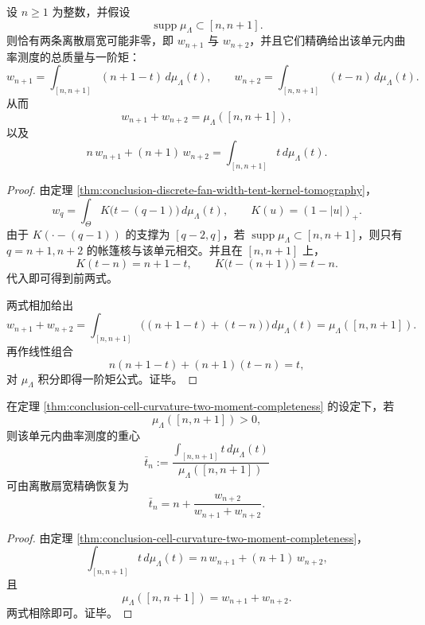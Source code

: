 \begin{theorem}[单元曲率的二矩完备性]\label{thm:conclusion-cell-curvature-two-moment-completeness}
设 \(n\ge 1\) 为整数，并假设
\[
\operatorname{supp}\mu_\Lambda\subset [n,n+1].
\]
则恰有两条离散扇宽可能非零，即 \(w_{n+1}\) 与 \(w_{n+2}\)，并且它们精确给出该单元内曲率测度的总质量与一阶矩：
\[
w_{n+1}=\int_{[n,n+1]}(n+1-t)\,d\mu_\Lambda(t),
\qquad
w_{n+2}=\int_{[n,n+1]}(t-n)\,d\mu_\Lambda(t).
\]
从而
\[
w_{n+1}+w_{n+2}=\mu_\Lambda([n,n+1]),
\]
以及
\[
n\,w_{n+1}+(n+1)\,w_{n+2}
=
\int_{[n,n+1]} t\,d\mu_\Lambda(t).
\]
\end{theorem}
\begin{proof}
由定理 \ref{thm:conclusion-discrete-fan-width-tent-kernel-tomography}，
\[
w_q=\int_\Theta K\bigl(t-(q-1)\bigr)\,d\mu_\Lambda(t),
\qquad
K(u)=(1-|u|)_+.
\]
由于 \(K(\cdot-(q-1))\) 的支撑为 \([q-2,q]\)，若 \(\operatorname{supp}\mu_\Lambda\subset[n,n+1]\)，则只有 \(q=n+1,n+2\) 的帐篷核与该单元相交。并且在 \([n,n+1]\) 上，
\[
K(t-n)=n+1-t,
\qquad
K\bigl(t-(n+1)\bigr)=t-n.
\]
代入即可得到前两式。

两式相加给出
\[
w_{n+1}+w_{n+2}
=
\int_{[n,n+1]}\bigl((n+1-t)+(t-n)\bigr)\,d\mu_\Lambda(t)
=
\mu_\Lambda([n,n+1]).
\]
再作线性组合
\[
n(n+1-t)+(n+1)(t-n)=t,
\]
对 \(\mu_\Lambda\) 积分即得一阶矩公式。证毕。
\end{proof}

\begin{corollary}[单元内曲率重心的邻峰比值公式]\label{cor:conclusion-cell-curvature-barycenter-adjacent-peak-ratio}
在定理 \ref{thm:conclusion-cell-curvature-two-moment-completeness} 的设定下，若
\[
\mu_\Lambda([n,n+1])>0,
\]
则该单元内曲率测度的重心
\[
\bar t_n:=
\frac{\int_{[n,n+1]} t\,d\mu_\Lambda(t)}
{\mu_\Lambda([n,n+1])}
\]
可由离散扇宽精确恢复为
\[
\bar t_n
=
n+\frac{w_{n+2}}{w_{n+1}+w_{n+2}}.
\]
\end{corollary}
\begin{proof}
由定理 \ref{thm:conclusion-cell-curvature-two-moment-completeness}，
\[
\int_{[n,n+1]} t\,d\mu_\Lambda(t)
=
n\,w_{n+1}+(n+1)\,w_{n+2},
\]
且
\[
\mu_\Lambda([n,n+1])=w_{n+1}+w_{n+2}.
\]
两式相除即可。证毕。
\end{proof}


